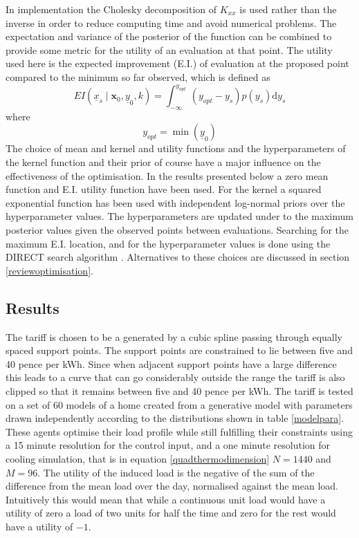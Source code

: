 \documentclass[a4paper, 10 pt, conference]{ieeeconf}  %
\begin{document}
In implementation the Cholesky decomposition of $K_{xx}$ is used rather than the inverse in order to reduce computing time and avoid numerical problems.
The expectation and variance of the posterior of the function can be combined to provide some metric for the utility of an evaluation at that point. The utility used here is the expected improvement (E.I.) of evaluation at the proposed point compared to the minimum so far observed, which is defined as
\begin{equation}
EI(\underline{x}_{s} \mid \mathbf{x}_0, \underline{y}_0, k)= \int_{-\infty  }^{y_{opt}} (y_{opt}-y_{s})p(y_{s}) \mathrm{d}y_{s}
\end{equation}
where
\begin{equation}
y_{opt} = \min(\underline{y}_{0})
\end{equation}
The choice of mean and kernel and utility functions and the hyperparameters of the kernel function and their prior of course have a major influence on the effectiveness of the optimisation. In the results presented below a zero mean function and E.I. utility function have been used. For the kernel a squared exponential function has been used with independent log-normal priors over the hyperparameter values. The hyperparameters are updated under to the maximum posterior values given the observed points between evaluations. Searching for the maximum E.I. location, and for the hyperparameter values is done using the DIRECT search algorithm \cite{jones1993lipschitzian}. Alternatives to these choices are discussed in section \ref{reviewoptimisation}.
\subsection{Results}
\label{result}
The tariff is chosen to be a generated by a cubic spline passing through equally spaced support points. The support points are constrained to lie between five and 40 pence per kWh. Since when adjacent support points have a large difference this leads to a curve that can go considerably outside the range the tariff is also clipped so that it remains between five and 40 pence per kWh. The tariff is tested on a set of 60 models of a home created from a generative model with parameters drawn independently according to the distributions shown in table \ref{modelpara}. These agents optimise their load profile while still fulfilling their constraints using a 15 minute resolution for the control input, and a one minute resolution for cooling simulation, that is in equation \ref{quadthermodimension} $N=1440$ and $M=96$. The utility of the induced load is the negative of the sum of the difference from the mean load over the day, normalised against the mean load. Intuitively this would mean that while a continuous unit load would have a utility of zero a load of two units for half the time and zero for the rest would have a utility of $-1$.
\end{document}

